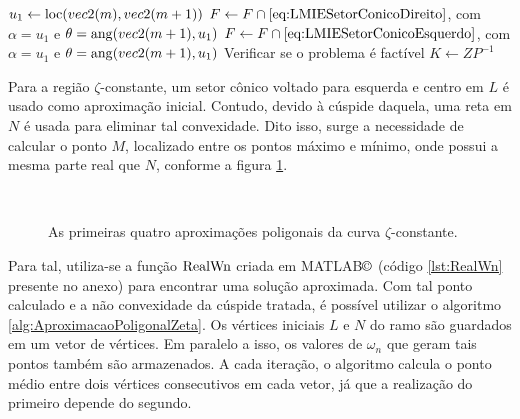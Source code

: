 \begin{algorithm}[ht!]
\begin{algorithmic}[1]
          \State $u_1 \gets \operatorname{loc}(vec2(m),vec2(m+1))$
            \State $F\gets F \cap \eqref{eq:LMIESetorConicoDireito}$, com $\alpha = u_1$ e $\theta = \operatorname{ang}(vec2(m+1),u_1)$ 
          \Else
            \State $F\gets F \cap \eqref{eq:LMIESetorConicoEsquerdo}$, com $\alpha = u_1$ e $\theta = \operatorname{ang}(vec2(m+1),u_1)$ 
          \EndIf
        \EndFor
        \State Verificar se o problema é factível 
    \EndWhile
    \State $K \gets ZP^{-1}$
  \end{algorithmic}
\end{algorithm}

Para a região $\zeta$-constante, um setor cônico voltado para esquerda e centro em $L$ é usado como aproximação inicial\cite{WISNIEWSKI2019}. Contudo, devido à cúspide daquela, uma reta em $N$ é usada para eliminar tal convexidade. Dito isso, surge a necessidade de calcular o ponto $M$, localizado entre os pontos máximo e mínimo, onde possui a mesma parte real que $N$, conforme a figura \ref{subfig:AproximacaoPoligonalZeta1}.

\begin{figure}[!ht]
  \centering
  \begin{subfigure}[t]{0.4\columnwidth}
      
      \caption{}
      \label{subfig:AproximacaoPoligonalZeta1}
  \end{subfigure}
  \begin{subfigure}[t]{0.4\columnwidth}
      
      \caption{}
      \label{subfig:AproximacaoPoligonalZeta2}
  \end{subfigure}
  \\
  \begin{subfigure}[t]{0.4\columnwidth}
    
    \caption{}
    \label{subfig:AproximacaoPoligonalZeta3}
  \end{subfigure}
  \begin{subfigure}[t]{0.4\columnwidth}
    
    \caption{}
    \label{subfig:AproximacaoPoligonalZeta4}
  \end{subfigure}
  \caption{As primeiras quatro aproximações poligonais da curva $\zeta$-constante.}
  \label{fig:AproximacoesPoligonalZeta}
\end{figure}

Para tal, utiliza-se a função $\operatorname{RealWn}$ criada em MATLAB$\copyright$\cite{MATLAB} (código \ref{lst:RealWn} presente no anexo) para encontrar uma solução aproximada. Com tal ponto calculado e a não convexidade da cúspide tratada, é possível utilizar o algoritmo \ref{alg:AproximacaoPoligonalZeta}. Os vértices iniciais $L$ e $N$ do ramo são guardados em um vetor de vértices. Em paralelo a isso, os valores de $\omega_n$ que geram tais pontos também são armazenados. A cada iteração, o algoritmo calcula o ponto médio entre dois vértices consecutivos em cada vetor, já que a realização do primeiro depende do segundo.

